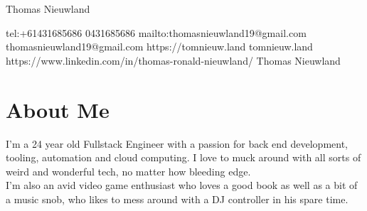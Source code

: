\documentclass{resume}
\begin{document}
\ContactName
{Thomas Nieuwland}                              %


\ContactInfoDigital
  {tel:+61431685686}                      %
  {0431685686}                           %
  {mailto:thomasnieuwland19@gmail.com}                %
  {thomasnieuwland19@gmail.com}                       %
  {https://tomnieuw.land}                     %
  {tomnieuw.land}                             %
  {https://www.linkedin.com/in/thomas-ronald-nieuwland/}
  {Thomas Nieuwland}


\section{{\faUser} About Me}
I'm a 24 year old Fullstack Engineer with a passion for back end development, tooling, automation and cloud computing. I love to muck around
with all sorts of weird and wonderful tech, no matter how bleeding edge. \\
I'm also an avid video game enthusiast who loves a good book as well as a bit of a music snob, who likes to mess around with a DJ controller in his spare time.
\end{document}
